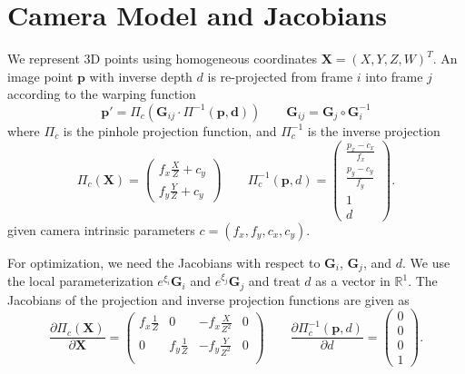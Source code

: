 \section{Camera Model and Jacobians}
We represent 3D points using homogeneous coordinates $\mathbf{X} = (X, Y, Z, W)^T$. An image point $\mathbf{p}$ with inverse depth $d$ is re-projected from frame $i$ into frame $j$ according to the warping function
\begin{equation}
    \mathbf{p}' = \Pi_c(\mathbf{G}_{ij} \cdot \Pi^{-1}(\mathbf{p}, \mathbf{d})) \qquad \mathbf{G}_{ij} = \mathbf{G}_j \circ \mathbf{G}_i^{-1}
\end{equation}
where $\Pi_c$ is the pinhole projection function, and $\Pi_c^{-1}$ is the inverse projection
\begin{equation}
    \Pi_c(\mathbf{X}) = \begin{pmatrix} f_x \frac{X}{Z} + c_y \\ f_y \frac{Y}{Z} + c_y \end{pmatrix} \qquad
    \Pi_c^{-1}(\mathbf{p}, d) =
    \begin{pmatrix} \frac{p_x - c_x}{f_x} \\ \frac{p_y - c_y}{f_y} \\ 1 \\ d \end{pmatrix}.
\end{equation}
given camera intrinsic parameters $c=(f_x, f_y, c_x, c_y)$.

For optimization, we need the Jacobians with respect to $\mathbf{G}_i$, $\mathbf{G}_j$, and $d$. We use the local parameterization $e^{\xi_i} \mathbf{G}_i$ and $e^{\xi_j} \mathbf{G}_j$ and treat $d$ as a vector in $\mathbb{R}^1$. The Jacobians of the projection and inverse projection functions are given as
\begin{equation}
    \frac{\partial \Pi_c(\mathbf{X})}{\partial \mathbf{X}} =
    \begin{pmatrix}
    f_x \frac{1}{Z} & 0 & -f_x \frac{X}{Z^2} & 0\\
    0 & f_y \frac{1}{Z} & -f_y \frac{Y}{Z^2} & 0 \\
    \end{pmatrix}
    \qquad
    \frac{\partial \Pi_c^{-1}(\mathbf{p}, d)}{\partial d} =
    \begin{pmatrix} 0 \\ 0 \\ 0 \\ 1 \end{pmatrix}.
\end{equation}


